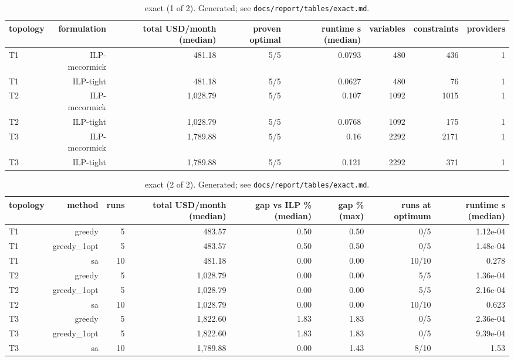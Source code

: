 \begin{table}[t]
\centering
\small
\begin{tabular}{lrrrrrrr}
\toprule
topology & formulation & total USD/month (median) & proven optimal & runtime s (median) & variables & constraints & providers \\
\midrule
T1 & ILP-mccormick & 481.18 & 5/5 & 0.0793 & 480 & 436 & 1 \\
T1 & ILP-tight & 481.18 & 5/5 & 0.0627 & 480 & 76 & 1 \\
T2 & ILP-mccormick & 1,028.79 & 5/5 & 0.107 & 1092 & 1015 & 1 \\
T2 & ILP-tight & 1,028.79 & 5/5 & 0.0768 & 1092 & 175 & 1 \\
T3 & ILP-mccormick & 1,789.88 & 5/5 & 0.16 & 2292 & 2171 & 1 \\
T3 & ILP-tight & 1,789.88 & 5/5 & 0.121 & 2292 & 371 & 1 \\
\bottomrule
\end{tabular}
\caption{exact (1 of 2). Generated; see \texttt{docs/report/tables/exact.md}.}
\label{tab:exact-1}
\end{table}

\begin{table}[t]
\centering
\small
\begin{tabular}{lrrrrrrr}
\toprule
topology & method & runs & total USD/month (median) & gap vs ILP \% (median) & gap \% (max) & runs at optimum & runtime s (median) \\
\midrule
T1 & greedy & 5 & 483.57 & 0.50 & 0.50 & 0/5 & 1.12e-04 \\
T1 & greedy\_1opt & 5 & 483.57 & 0.50 & 0.50 & 0/5 & 1.48e-04 \\
T1 & sa & 10 & 481.18 & 0.00 & 0.00 & 10/10 & 0.278 \\
T2 & greedy & 5 & 1,028.79 & 0.00 & 0.00 & 5/5 & 1.36e-04 \\
T2 & greedy\_1opt & 5 & 1,028.79 & 0.00 & 0.00 & 5/5 & 2.16e-04 \\
T2 & sa & 10 & 1,028.79 & 0.00 & 0.00 & 10/10 & 0.623 \\
T3 & greedy & 5 & 1,822.60 & 1.83 & 1.83 & 0/5 & 2.36e-04 \\
T3 & greedy\_1opt & 5 & 1,822.60 & 1.83 & 1.83 & 0/5 & 9.39e-04 \\
T3 & sa & 10 & 1,789.88 & 0.00 & 1.43 & 8/10 & 1.53 \\
\bottomrule
\end{tabular}
\caption{exact (2 of 2). Generated; see \texttt{docs/report/tables/exact.md}.}
\label{tab:exact-2}
\end{table}
